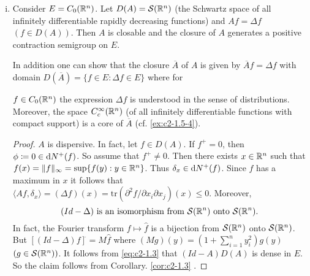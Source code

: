\begin{examples}
\begin{enumerate}[(i)]
\begin{proof}
Second case: $p = 1$.
Let $\phi(x) = 1$ for $x \in M$ and $\phi(x) = 0$ for $x \not\in M$. 
Then $\phi \in \diff{N^{+}}(f)$ and
\begin{align*}
\langle Af,\phi \rangle &= \sum_{n} \int_{a_{n}}^{b_{n}} f''(x) \, \dx = \sum_{n} (f'(b_{n}) - f'(a_{n})) \leq 0
\end{align*}
since $f'(b_{n}) \leq 0$ and $f'(a_{n}) \geq 0$ for all $n$.

We have shown that $A$ is dispersive. 
As in \ref{ex:c2-1.5-1}   one shows that $(Id - A)$ is surjective. 
Now the claim follows from Theorem \ref{thm:c2-1.2}  .
\end{proof}

\item \label{ex:c2-1.5-3} 
Consider $E = C_{0}(\mathbb{R}^{n})$. 
Let $D(A) = \mathcal{S}(\mathbb{R}^{n})$ (the Schwartz space of all infinitely differentiable rapidly decreasing functions) and $Af = \Delta f$ $(f \in D(A))$. 
Then $A$ is closable and the closure of $A$ generates a positive contraction semigroup on $E$.

\begin{remark*}\label{rem:c2-1.2}
In addition one can show that the closure $\overline{A}$ of $A$ is given by $\overline{A}f = \Delta f$ with domain $D(\overline{A}) = \{f \in E : \Delta f \in E\}$ where for

$f \in C_{0}(\mathbb{R}^{n})$ the expression $\Delta f$ is understood in the sense of distributions. 
Moreover, the space $C_{c}^{\infty}(\mathbb{R}^{n})$ (of all infinitely differentiable functions with compact support) is a core of $\overline{A}$ (cf. \ref{ex:c2-1.5-4}).
\end{remark*}

\begin{proof}
$A$ is dispersive. 
In fact, let $f \in D(A)$. 
If $f^{+} = 0$, then $\phi \coloneqq 0 \in \mathop{}\!\mathrm{d}{N^{+}}(f)$. 
So assume that $f^{+} \neq 0$. 
Then there exists $x \in \mathbb{R}^{n}$ such that $f(x) = \|f\|_{\infty} = \sup\{f(y) : y \in \mathbb{R}^{n}\}$. 
Thus $\delta_{x} \in \mathop{}\!\mathrm{d}{N^{+}}(f)$.
Since $f$ has a maximum in $x$ it follows that $\langle Af,\delta_{x} \rangle = (\Delta f)(x) = \text{tr}(\partial^{2}f/\partial x_{i}\partial x_{j})(x) \leq 0$. 
Moreover,
\begin{equation}\label{eq:c2-1.3}
(Id - \Delta) \text{ is an isomorphism from } \mathcal{S}(\mathbb{R}^{n}) \text{ onto } \mathcal{S}(\mathbb{R}^{n}).
\end{equation}
In fact, the Fourier transform $f \mapsto \hat{f}$ is a bijection from $\mathcal{S}(\mathbb{R}^{n})$ onto $\mathcal{S}(\mathbb{R}^{n})$.
But $[(Id - \Delta)f]^{\hat{}} = M\hat{f}$ where $(Mg)(y) = (1 + \sum_{i=1}^{n} y_{i}^{2})g(y)$ $(g \in \mathcal{S}(\mathbb{R}^{n}))$. It follows from \eqref{eq:c2-1.3}    that $(Id - A)D(A)$ is dense in $E$. So the claim follows from Corollary. \ref{cor:c2-1.3}  .
\end{proof}


\end{enumerate}
\end{examples}
